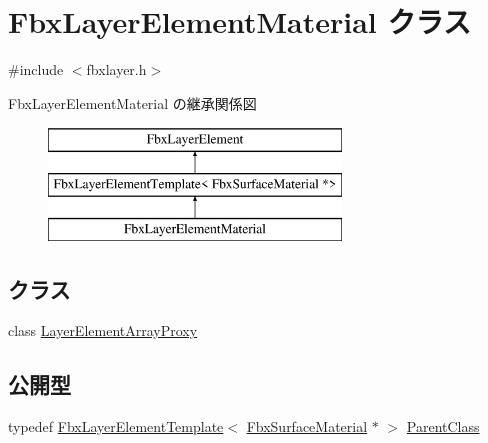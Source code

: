 \hypertarget{class_fbx_layer_element_material}{}\section{Fbx\+Layer\+Element\+Material クラス}
\label{class_fbx_layer_element_material}


{\ttfamily \#include $<$fbxlayer.\+h$>$}

Fbx\+Layer\+Element\+Material の継承関係図\begin{figure}[H]
\begin{center}
\leavevmode
\includegraphics[height=3.000000cm]{class_fbx_layer_element_material}
\end{center}
\end{figure}
\subsection*{クラス}
\begin{DoxyCompactItemize}
\item 
class \hyperlink{class_fbx_layer_element_material_1_1_layer_element_array_proxy}{Layer\+Element\+Array\+Proxy}
\end{DoxyCompactItemize}
\subsection*{公開型}
\begin{DoxyCompactItemize}
\item 
typedef \hyperlink{class_fbx_layer_element_template}{Fbx\+Layer\+Element\+Template}$<$ \hyperlink{class_fbx_surface_material}{Fbx\+Surface\+Material} $\ast$ $>$ \hyperlink{class_fbx_layer_element_material_a8f8718ab06cb0f6a9aa82205573fa64b}{Parent\+Class}
\end{DoxyCompactItemize}
